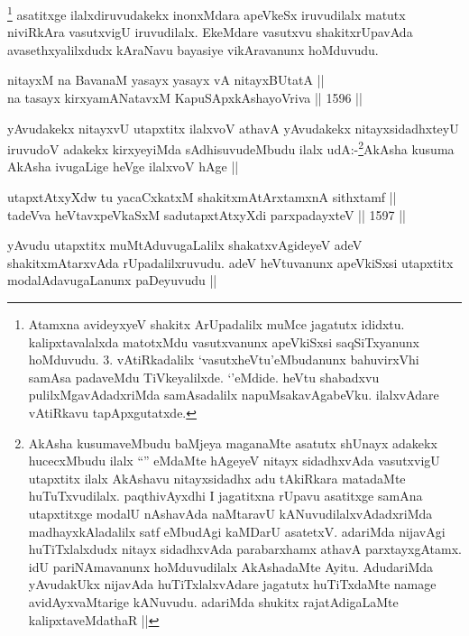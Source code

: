 \begin{artha}
\footnote{Atamxna avideyxyeV shakitx ArUpadalilx muMce jagatutx ididxtu. kalipxtavalalxda matotxMdu vasutxvanunx apeVkiSxsi saqSiTxyanunx hoMduvudu. 3. vAtiRkadalilx `vasutxheVtu'eMbudanunx bahuvirxVhi samAsa padaveMdu TiVkeyalilxde. `\stext'eMdide. heVtu shabadxvu pulilxMgavAdadxriMda samAsadalilx napuMsakavAgabeVku. ilalxvAdare vAtiRkavu tapApxgutatxde.}
asatitxge ilalxdiruvudakekx inonxMdara apeVkeSx iruvudilalx matutx niviRkAra vasutxvigU iruvudilalx. EkeMdare vasutxvu shakitxrUpavAda avasethxyalilxdudx kAraNavu bayasiye vikAravanunx hoMduvudu.
\end{artha}


\begin{shl}
nitayxM na BavanaM yasayx yasayx vA nitayxBUtatA || \\
na tasayx kirxyamANatavxM KapuSApxkAshayoVriva \hfill || 1596 ||  
\end{shl}

\begin{artha}
yAvudakekx nitayxvU utapxtitx ilalxvoV athavA yAvudakekx nitayxsidadhxteyU iruvudoV adakekx kirxyeyiMda sAdhisuvudeMbudu ilalx udA:-\footnote{AkAsha kusumaveMbudu baMjeya maganaMte asatutx shUnayx adakekx hucecxMbudu ilalx ``\stext'' eMdaMte hAgeyeV nitayx sidadhxvAda vasutxvigU utapxtitx ilalx AkAshavu nitayxsidadhx adu tAkiRkara matadaMte huTuTxvudilalx. paqthivAyxdhi I jagatitxna rUpavu asatitxge samAna utapxtitxge modalU nAshavAda naMtaravU kANuvudilalxvAdadxriMda madhayxkAladalilx satf eMbudAgi kaMDarU asatetxV. \stext adariMda nijavAgi huTiTxlalxdudx nitayx sidadhxvAda parabarxhamx athavA parxtayxgAtamx. idU pariNAmavanunx hoMduvudilalx AkAshadaMte Ayitu. AdudariMda yAvudakUkx nijavAda huTiTxlalxvAdare jagatutx huTiTxdaMte namage avidAyxvaMtarige kANuvudu. adariMda shukitx rajatAdigaLaMte kalipxtaveMdathaR ||}AkAsha kusuma AkAsha ivugaLige heVge ilalxvoV hAge ||
\end{artha}

\begin{shl}
utapxtAtxyXdw tu yacaCxkatxM shakitxmAtArxtamxnA sithxtamf || \\
tadeVva heVtavxpeVkaSxM sadutapxtAtxyXdi parxpadayxteV \hfill || 1597 ||  
\end{shl}

\begin{artha}
yAvudu utapxtitx muMtAduvugaLalilx shakatxvAgideyeV adeV shakitxmAtarxvAda rUpadalilxruvudu. adeV heVtuvanunx apeVkiSxsi utapxtitx modalAdavugaLanunx paDeyuvudu ||
\end{artha}

